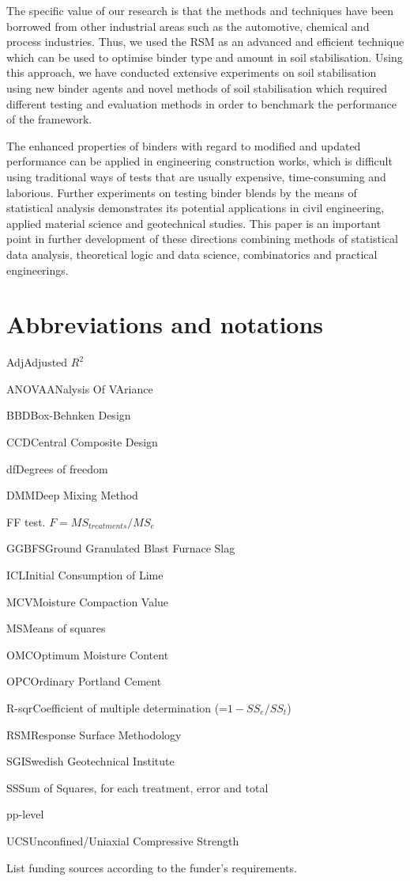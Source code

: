\documentclass[eprint,
]{actapoly}
\begin{document}
The specific value of our research is that the methods and techniques have been borrowed from other industrial areas such as the automotive, chemical and process industries. Thus, we used the RSM as an advanced and efficient technique which can be used to optimise binder type and amount in soil stabilisation. Using this approach, we have conducted extensive experiments on soil stabilisation using new binder agents and novel methods of soil stabilisation which required different testing and evaluation methods in order to benchmark the performance of the framework. 

The enhanced properties of binders with regard to modified and updated performance can be applied in engineering construction works, which is difficult using traditional ways of tests that are usually expensive, time-consuming and laborious. Further experiments on testing binder blends by the means of statistical analysis demonstrates its potential applications in civil engineering, applied material science and geotechnical studies. This paper is an important point in further development of these directions combining methods of statistical data analysis, theoretical logic and data science, combinatorics and practical engineerings.

\section{Abbreviations and notations}\label{symb}
\begin{nomenclature}
\item{Adj}{Adjusted $R^2$}
\item{ANOVA}{ANalysis Of VAriance}
\item{BBD}{Box-Behnken Design}
\item{CCD}{Central Composite Design}
\item{df}{Degrees of freedom}
\item{DMM}{Deep Mixing Method}
\item{F}{F test. $F=MS_{treatments}/MS_{e}$}
\item{GGBFS}{Ground Granulated Blast Furnace Slag}
\item{ICL}{Initial Consumption of Lime}
\item{MCV}{Moisture Compaction Value}
\item{MS}{Means of squares}
\item{OMC}{Optimum Moisture Content}
\item{OPC}{Ordinary Portland Cement}
\item{R-sqr}{Coefficient of multiple determination (=$1-SS_{e}/SS_{t}$)}
\item{RSM}{Response Surface Methodology}
\item{SGI}{Swedish Geotechnical Institute}
\item{SS}{Sum of Squares, for each treatment, error and total}
\item{p}{p-level}
\item{UCS}{Unconfined/Uniaxial Compressive Strength}
\end{nomenclature}

\begin{acknowledgements}
List funding sources according to the funder’s requirements.
\end{acknowledgements}




\end{document}
